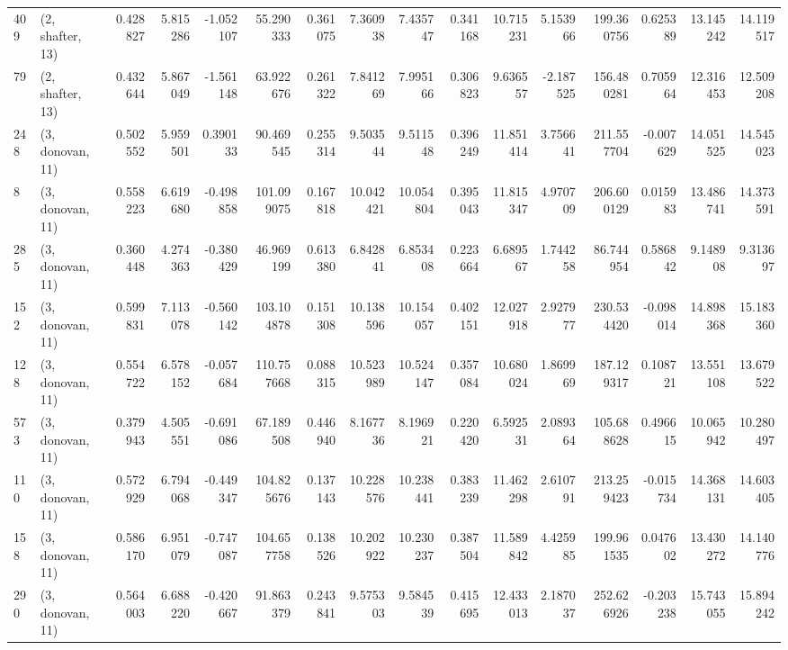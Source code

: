\begin{tabular}{llrrrrrrrrrrrrrr}
409 &  (2, shafter, 13) &   0.428827 &   5.815286 &  -1.052107 &    55.290333 &   0.361075 &   7.360938 &   7.435747 &  0.341168 &  10.715231 &   5.153966 &    199.360756 &   0.625389 &   13.145242 &   14.119517 \\
79  &  (2, shafter, 13) &   0.432644 &   5.867049 &  -1.561148 &    63.922676 &   0.261322 &   7.841269 &   7.995166 &  0.306823 &   9.636557 &  -2.187525 &    156.480281 &   0.705964 &   12.316453 &   12.509208 \\
248 &  (3, donovan, 11) &   0.502552 &   5.959501 &   0.390133 &    90.469545 &   0.255314 &   9.503544 &   9.511548 &  0.396249 &  11.851414 &   3.756641 &    211.557704 &  -0.007629 &   14.051525 &   14.545023 \\
8   &  (3, donovan, 11) &   0.558223 &   6.619680 &  -0.498858 &   101.099075 &   0.167818 &  10.042421 &  10.054804 &  0.395043 &  11.815347 &   4.970709 &    206.600129 &   0.015983 &   13.486741 &   14.373591 \\
285 &  (3, donovan, 11) &   0.360448 &   4.274363 &  -0.380429 &    46.969199 &   0.613380 &   6.842841 &   6.853408 &  0.223664 &   6.689567 &   1.744258 &     86.744954 &   0.586842 &    9.148908 &    9.313697 \\
152 &  (3, donovan, 11) &   0.599831 &   7.113078 &  -0.560142 &   103.104878 &   0.151308 &  10.138596 &  10.154057 &  0.402151 &  12.027918 &   2.927977 &    230.534420 &  -0.098014 &   14.898368 &   15.183360 \\
128 &  (3, donovan, 11) &   0.554722 &   6.578152 &  -0.057684 &   110.757668 &   0.088315 &  10.523989 &  10.524147 &  0.357084 &  10.680024 &   1.869969 &    187.129317 &   0.108721 &   13.551108 &   13.679522 \\
573 &  (3, donovan, 11) &   0.379943 &   4.505551 &  -0.691086 &    67.189508 &   0.446940 &   8.167736 &   8.196921 &  0.220420 &   6.592531 &   2.089364 &    105.688628 &   0.496615 &   10.065942 &   10.280497 \\
110 &  (3, donovan, 11) &   0.572929 &   6.794068 &  -0.449347 &   104.825676 &   0.137143 &  10.228576 &  10.238441 &  0.383239 &  11.462298 &   2.610791 &    213.259423 &  -0.015734 &   14.368131 &   14.603405 \\
158 &  (3, donovan, 11) &   0.586170 &   6.951079 &  -0.747087 &   104.657758 &   0.138526 &  10.202922 &  10.230237 &  0.387504 &  11.589842 &   4.425985 &    199.961535 &   0.047602 &   13.430272 &   14.140776 \\
290 &  (3, donovan, 11) &   0.564003 &   6.688220 &  -0.420667 &    91.863379 &   0.243841 &   9.575303 &   9.584539 &  0.415695 &  12.433013 &   2.187037 &    252.626926 &  -0.203238 &   15.743055 &   15.894242 \\

\end{tabular}
